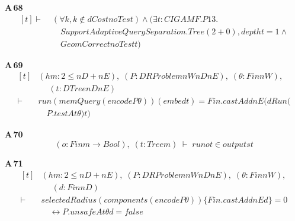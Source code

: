 \noindent\textbf{A\,68}\quad{}
{\footnotesize\[ \begin{aligned}[t]
\vdash\;&(\forall \mathit{k}, \mathit{k} \notin \mathit{dCost} \mathit{noTest}) \wedge (\exists \mathit{t} : \mathit{CIGAMF}.\mathit{P13}.\\
&\quad \mathit{SupportAdaptiveQuerySeparation}.\mathit{Tree} (2 + 0), \mathit{depth} \mathit{t} = 1 \wedge\\
&\quad \mathit{GeomCorrect} \mathit{noTest} \mathit{t})
\end{aligned} \]}

\noindent\textbf{A\,69}\quad{}
{\footnotesize\[ \begin{aligned}[t]
&(\mathit{hm} : 2 \leq \mathit{nD} + \mathit{nE}),\; (\mathit{P} : \mathit{DRProblem} \mathit{nW} \mathit{nD} \mathit{nE}),\; (\theta : \mathit{Fin} \mathit{nW}),\\
&\quad \; (\mathit{t} : \mathit{DTree} \mathit{nD} \mathit{nE})\\
\vdash\;&\mathit{run} (\mathit{memQuery} (\mathit{encode} \mathit{P} \theta )) (\mathit{embed} \mathit{t}) = \mathit{Fin}.\mathit{castAdd} \mathit{nE} (\mathit{dRun} (\\
&\quad \mathit{P}.\mathit{testAt} \theta ) \mathit{t})
\end{aligned} \]}

\noindent\textbf{A\,70}\quad{}
{\footnotesize\[ (\mathit{o} : \mathit{Fin} \mathit{m} \to \mathit{Bool}),\; (\mathit{t} : \mathit{Tree} \mathit{m}) \;\vdash\; \mathit{run} \mathit{o} \mathit{t} \in \mathit{outputs} \mathit{t} \]}

\noindent\textbf{A\,71}\quad{}
{\footnotesize\[ \begin{aligned}[t]
&(\mathit{hm} : 2 \leq \mathit{nD} + \mathit{nE}),\; (\mathit{P} : \mathit{DRProblem} \mathit{nW} \mathit{nD} \mathit{nE}),\; (\theta : \mathit{Fin} \mathit{nW}),\\
&\quad \; (\mathit{d} : \mathit{Fin} \mathit{nD})\\
\vdash\;&\mathit{selectedRadius} (\mathit{components} (\mathit{encode} \mathit{P} \theta )) \{ \mathit{Fin}.\mathit{castAdd} \mathit{nE} \mathit{d}\} = 0\\
&\quad \leftrightarrow \mathit{P}.\mathit{unsafeAt} \theta \mathit{d} = \mathit{false}
\end{aligned} \]}

